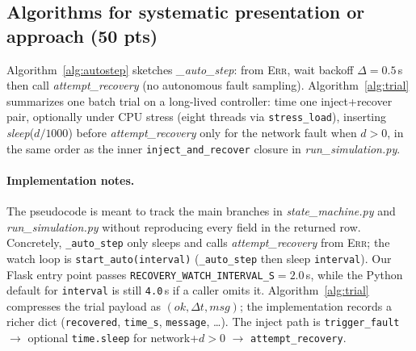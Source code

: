 \documentclass[sigconf,authorversion,nonacm]{acmart}
\begin{document}
\subsection{Algorithms for systematic presentation or approach (50 pts)}
Algorithm~\ref{alg:autostep} sketches \emph{\_auto\_step}: from \textsc{Err}, wait backoff $\Delta{=}0.5$\,s then call \emph{attempt\_recovery} (no autonomous fault sampling). Algorithm~\ref{alg:trial} summarizes one batch trial on a long-lived controller: time one inject+recover pair, optionally under CPU stress (eight threads via \texttt{stress\_load}), inserting \emph{sleep}($d/1000$) before \emph{attempt\_recovery} only for the network fault when $d{>}0$, in the same order as the inner \texttt{inject\_and\_recover} closure in \emph{run\_simulation.py}.

\paragraph{Implementation notes.}
The pseudocode is meant to track the main branches in \emph{state\_machine.py} and \emph{run\_simulation.py} without reproducing every field in the returned row. Concretely, \texttt{\_auto\_step} only sleeps and calls \emph{attempt\_recovery} from \textsc{Err}; the watch loop is \texttt{start\_auto(interval)} (\texttt{\_auto\_step} then sleep \texttt{interval}). Our Flask entry point passes \texttt{RECOVERY\_WATCH\_INTERVAL\_S}${=}2.0$\,s, while the Python default for \texttt{interval} is still \texttt{4.0}\,s if a caller omits it. Algorithm~\ref{alg:trial} compresses the trial payload as $(ok,\Delta t,msg)$; the implementation records a richer dict (\texttt{recovered}, \texttt{time\_s}, \texttt{message}, \ldots). The inject path is \texttt{trigger\_fault} $\rightarrow$ optional \texttt{time.sleep} for network+$d{>}0$ $\rightarrow$ \texttt{attempt\_recovery}.

\begin{algorithm}[!t]
\caption{Recovery-watch timestep (\emph{\_auto\_step})}
\label{alg:autostep}
\KwRet{}\;
\end{algorithm}
\end{document}
